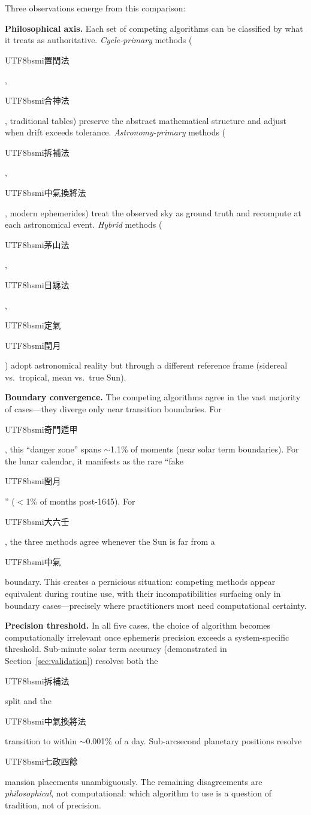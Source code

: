 \documentclass[10pt,a4paper]{article}
\newcommand{\zh}[1]{\begin{CJK}{UTF8}{bsmi}#1\end{CJK}}
\begin{document}
Three observations emerge from this comparison:

\textbf{Philosophical axis.} Each set of competing algorithms can be
classified by what it treats as authoritative. \emph{Cycle-primary}
methods (\zh{置閏法}, \zh{合神法}, traditional tables) preserve the
abstract mathematical structure and adjust when drift exceeds tolerance.
\emph{Astronomy-primary} methods (\zh{拆補法}, \zh{中氣換將法}, modern
ephemerides) treat the observed sky as ground truth and recompute at each
astronomical event. \emph{Hybrid} methods (\zh{茅山法}, \zh{日躔法},
\zh{定氣} \zh{閏月}) adopt astronomical reality but through a different
reference frame (sidereal vs.\ tropical, mean vs.\ true Sun).

\textbf{Boundary convergence.} The competing algorithms agree in the vast
majority of cases---they diverge only near transition boundaries. For
\zh{奇門遁甲}, this ``danger zone'' spans $\sim$1.1\% of moments (near
solar term boundaries). For the lunar calendar, it manifests as the rare
``fake \zh{閏月}'' ($<$1\% of months post-1645). For \zh{大六壬}, the
three methods agree whenever the Sun is far from a \zh{中氣} boundary.
This creates a pernicious situation: competing methods appear equivalent
during routine use, with their incompatibilities surfacing only in
boundary cases---precisely where practitioners most need computational
certainty.

\textbf{Precision threshold.} In all five cases, the choice of algorithm
becomes computationally irrelevant once ephemeris precision exceeds a
system-specific threshold. Sub-minute solar term accuracy (demonstrated
in Section~\ref{sec:validation}) resolves both the \zh{拆補法} split and
the \zh{中氣換將法} transition to within $\sim$0.001\% of a day.
Sub-arcsecond planetary positions resolve \zh{七政四餘} mansion placements
unambiguously. The remaining disagreements are \emph{philosophical}, not
computational: which algorithm to use is a question of tradition, not of
precision.
\end{document}
